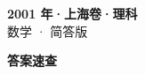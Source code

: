 \documentclass[zihao=-4, a4paper]{ctexart}
\begin{document}
\begin{center}
  {\Large\bfseries 2001 年·上海卷·理科}\\[4pt]
  {\large 数学 · 简答版}
\end{center}
\medskip
{}

\clearpage
{}
\begin{center}{\Large\bfseries 答案速查}\end{center}
\medskip

\end{document}
